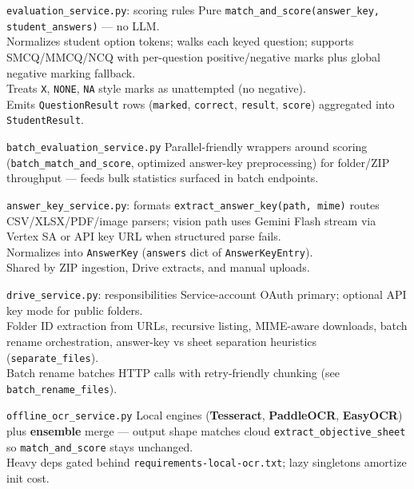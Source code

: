 \documentclass[aspectratio=169]{beamer}
\begin{document}
\begin{frame}{\texttt{evaluation\_service.py}: scoring rules}
  \small
  Pure \texttt{match\_and\_score(answer\_key, student\_answers)} --- no LLM.\\
  Normalizes student option tokens; walks each keyed question; supports SMCQ/MMCQ/NCQ with per-question positive/negative marks plus global negative marking fallback.\\
  Treats \texttt{X}, \texttt{NONE}, \texttt{NA} style marks as unattempted (no negative).\\
  Emits \texttt{QuestionResult} rows (\texttt{marked}, \texttt{correct}, \texttt{result}, \texttt{score}) aggregated into \texttt{StudentResult}.
\end{frame}

\begin{frame}{\texttt{batch\_evaluation\_service.py}}
  \small
  Parallel-friendly wrappers around scoring (\texttt{batch\_match\_and\_score}, optimized answer-key preprocessing) for folder/ZIP throughput --- feeds bulk statistics surfaced in batch endpoints.
\end{frame}

\begin{frame}{\texttt{answer\_key\_service.py}: formats}
  \small
  \texttt{extract\_answer\_key(path, mime)} routes CSV/XLSX/PDF/image parsers; vision path uses Gemini Flash stream via Vertex SA or API key URL when structured parse fails.\\
  Normalizes into \texttt{AnswerKey} (\texttt{answers} dict of \texttt{AnswerKeyEntry}).\\
  Shared by ZIP ingestion, Drive extracts, and manual uploads.
\end{frame}

\begin{frame}{\texttt{drive\_service.py}: responsibilities}
  \small
  Service-account OAuth primary; optional API key mode for public folders.\\
  Folder ID extraction from URLs, recursive listing, MIME-aware downloads, batch rename orchestration, answer-key vs sheet separation heuristics (\texttt{separate\_files}).\\
  Batch rename batches HTTP calls with retry-friendly chunking (see \texttt{batch\_rename\_files}).
\end{frame}

\begin{frame}{\texttt{offline\_ocr\_service.py}}
  \small
  Local engines (\textbf{Tesseract}, \textbf{PaddleOCR}, \textbf{EasyOCR}) plus \textbf{ensemble} merge --- output shape matches cloud \texttt{extract\_objective\_sheet} so \texttt{match\_and\_score} stays unchanged.\\
  Heavy deps gated behind \texttt{requirements-local-ocr.txt}; lazy singletons amortize init cost.
\end{frame}
\end{document}
